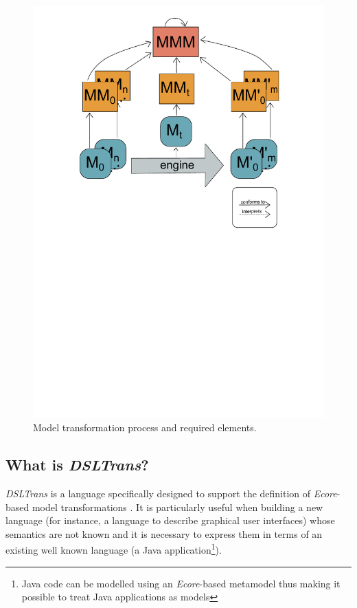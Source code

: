 \begin{figure}[h]
\begin{center}
  \includegraphics[scale=0.6, trim=3.3cm 13.6cm 3.1cm 0.7cm,
  clip]{imgs/model_transformation.pdf}
  \caption{Model transformation process and required elements.}
  \label{fig:model_trans_general}
\end{center}
\end{figure}

\clearpage

\subsection{What is \emph{DSLTrans}?}

\emph{DSLTrans} is a language specifically designed to support the definition of
\emph{Ecore}-based model transformations \cite{dsltranslator}. It is particularly
useful when building a new language (for instance, a language to describe graphical
user interfaces) whose semantics are not known and it is necessary
to express them in terms of an existing well known language (a Java
application\footnote{Java code can be modelled using an \emph{Ecore}-based metamodel
thus making it possible to treat Java applications as models}).

